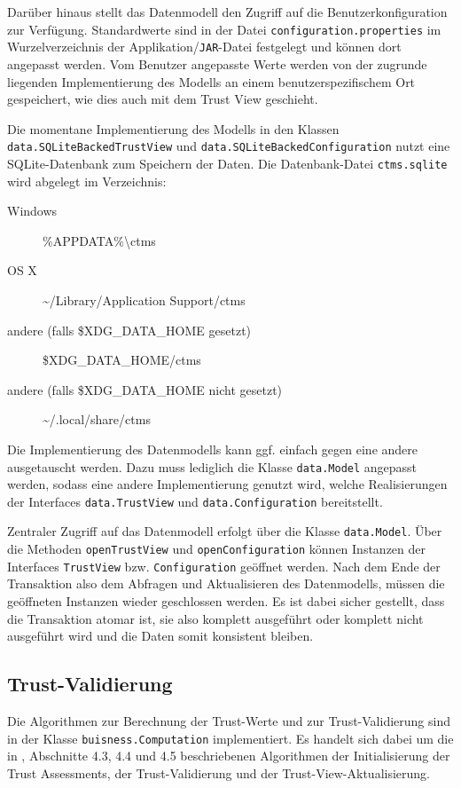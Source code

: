\documentclass[accentcolor=tud1c,article,colorback,11pt]{tudreport}
\begin{document}
Darüber hinaus stellt das Datenmodell den Zugriff auf die Benutzerkonfiguration zur Verfügung. Standardwerte sind in der Datei \texttt{configuration.properties} im Wurzelverzeichnis der Applikation/\texttt{JAR}-Datei festgelegt und können dort angepasst werden. Vom Benutzer angepasste Werte werden von der zugrunde liegenden Implementierung des Modells an einem benutzerspezifischem Ort gespeichert, wie dies auch mit dem Trust View geschieht.

Die momentane Implementierung des Modells in den Klassen \texttt{data.SQLiteBackedTrustView} und \texttt{data.SQLiteBackedConfiguration} nutzt eine SQLite-Datenbank zum Speichern der Daten. Die Datenbank-Datei \texttt{ctms.sqlite} wird abgelegt im Verzeichnis:
\begin{description}
\item[Windows] \%APPDATA\%\textbackslash ctms
\item[OS X] \textasciitilde/Library/Application Support/ctms
\item[andere (falls \$XDG\_DATA\_HOME gesetzt)] \$XDG\_DATA\_HOME/ctms
\item[andere (falls \$XDG\_DATA\_HOME nicht gesetzt)] \textasciitilde/.local/share/ctms
\end{description}

Die Implementierung des Datenmodells kann ggf. einfach gegen eine andere ausgetauscht werden. Dazu muss lediglich die Klasse \texttt{data.Model} angepasst werden, sodass eine andere Implementierung genutzt wird, welche Realisierungen der Interfaces \texttt{data.TrustView} und \texttt{data.Configuration} bereitstellt.

Zentraler Zugriff auf das Datenmodell erfolgt über die Klasse \texttt{data.Model}. Über die Methoden \texttt{openTrustView} und \texttt{openConfiguration} können Instanzen der Interfaces \texttt{TrustView} bzw. \texttt{Configuration} geöffnet werden. Nach dem Ende der Transaktion also dem Abfragen und Aktualisieren des Datenmodells, müssen die geöffneten Instanzen wieder geschlossen werden. Es ist dabei sicher gestellt, dass die Transaktion atomar ist, sie also komplett ausgeführt oder komplett nicht ausgeführt wird und die Daten somit konsistent bleiben.

\subsection{Trust-Validierung}

Die Algorithmen zur Berechnung der Trust-Werte und zur Trust-Validierung sind in der Klasse \texttt{buisness.Computation} implementiert. Es handelt sich dabei um die in \cite{braun2013trust}, Abschnitte 4.3, 4.4 und 4.5 beschriebenen Algorithmen der Initialisierung der Trust Assessments, der Trust-Validierung und der Trust-View-Aktualisierung.
\end{document}
